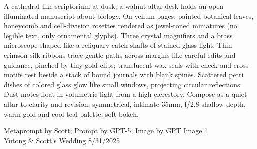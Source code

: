 \documentclass[12pt]{article}
\begin{document}
\noindent
\begin{adjustbox}{max size={\textwidth}{\textheight}}
\begin{varwidth}{\textwidth}
\RaggedRight
\footnotesize
A cathedral-like scriptorium at dusk; a walnut altar-desk holds an open illuminated manuscript about biology. On vellum pages: painted botanical leaves, honeycomb and cell-division rosettes rendered as jewel-toned miniatures (no legible text, only ornamental glyphs). Three crystal magnifiers and a brass microscope shaped like a reliquary catch shafts of stained-glass light. Thin crimson silk ribbons trace gentle paths across margins like careful edits and guidance, pinched by tiny gold clips; translucent wax seals with check and cross motifs rest beside a stack of bound journals with blank spines. Scattered petri dishes of colored glass glow like small windows, projecting circular reflections. Dust motes float in volumetric light from a high clerestory. Compose as a quiet altar to clarity and revision, symmetrical, intimate 35mm, f/2.8 shallow depth, warm gold and cool teal palette, soft bokeh.
\end{varwidth}
\end{adjustbox}
\vfill
{\raggedleft\footnotesize
Metaprompt by Scott; Prompt by GPT-5; Image by GPT Image 1 \\
Yutong \& Scott's Wedding 8/31/2025\par}
\end{document}
